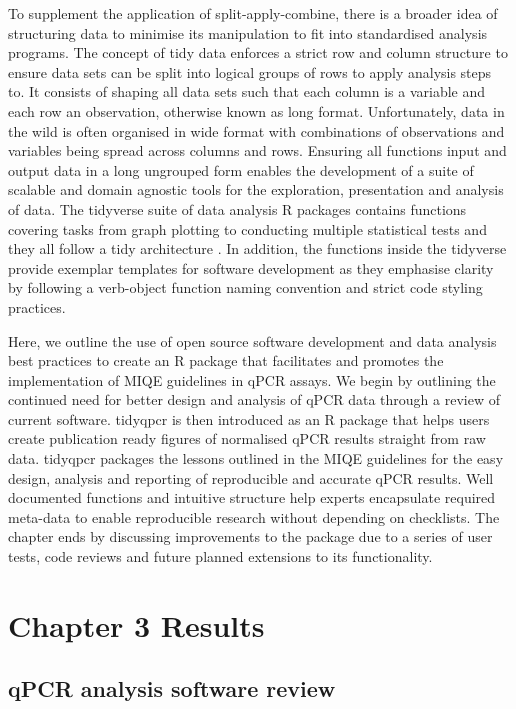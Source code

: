 \documentclass[../main.tex]{subfiles}
\begin{document}
To supplement the application of split-apply-combine, there is a broader idea of structuring data to minimise its manipulation to fit into standardised analysis programs. 
The concept of tidy data enforces a strict row and column structure to ensure data sets can be split into logical groups of rows to apply analysis steps to. 
It consists of shaping all data sets such that each column is a variable and each row an observation, otherwise known as long format.
Unfortunately, data in the wild is often organised in wide format with combinations of observations and variables being spread across columns and rows.
Ensuring all functions input and output data in a long ungrouped form enables the development of a suite of scalable and domain agnostic tools for the exploration, presentation and analysis of data.
The tidyverse suite of data analysis R packages contains functions covering tasks from graph plotting to conducting multiple statistical tests and they all follow a tidy architecture \parencite{Wickham2014}. 
In addition, the functions inside the tidyverse provide exemplar templates for software development as they emphasise clarity by following a verb-object function naming convention and strict code styling practices.

Here, we outline the use of open source software development and data analysis best practices to create an R package that facilitates and promotes the implementation of MIQE guidelines in qPCR assays.
We begin by outlining the continued need for better design and analysis of qPCR data through a review of current software.
tidyqpcr is then introduced as an R package that helps users create publication ready figures of normalised qPCR results straight from raw data. 
tidyqpcr packages the lessons outlined in the MIQE guidelines for the easy design, analysis and reporting of reproducible and accurate qPCR results.
Well documented functions and intuitive structure help experts encapsulate required meta-data to enable reproducible research without depending on checklists.
The chapter ends by discussing improvements to the package due to a series of user tests, code reviews and future planned extensions to its functionality.

\section{Chapter 3 Results}

\subsection{qPCR analysis software review}
\end{document}
